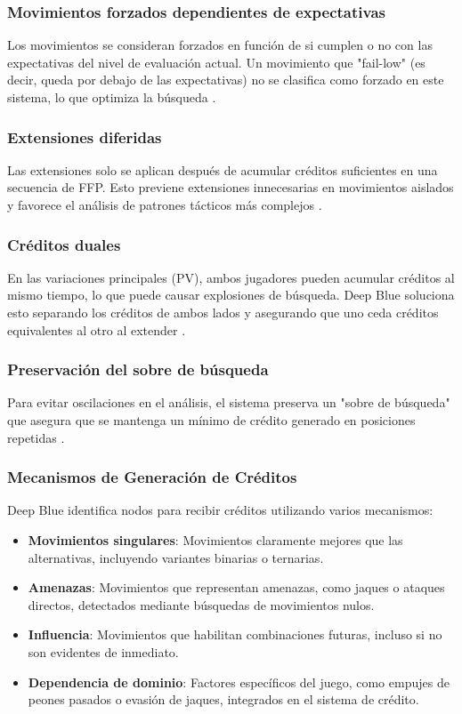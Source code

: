 \documentclass[12pt,a4paper]{article}
\begin{document}
\subsubsection*{Movimientos forzados dependientes de expectativas}
Los movimientos se consideran forzados en función de si cumplen o no con las expectativas del nivel de evaluación actual. Un movimiento que "fail-low" (es decir, queda por debajo de las expectativas) no se clasifica como forzado en este sistema, lo que optimiza la búsqueda \cite{campbell2002deepblue}.

\subsubsection*{Extensiones diferidas}
Las extensiones solo se aplican después de acumular créditos suficientes en una secuencia de FFP. Esto previene extensiones innecesarias en movimientos aislados y favorece el análisis de patrones tácticos más complejos \cite{campbell2002deepblue}.

\subsubsection*{Créditos duales}
En las variaciones principales (PV), ambos jugadores pueden acumular créditos al mismo tiempo, lo que puede causar explosiones de búsqueda. Deep Blue soluciona esto separando los créditos de ambos lados y asegurando que uno ceda créditos equivalentes al otro al extender \cite{campbell2002deepblue}.

\subsubsection*{Preservación del sobre de búsqueda}
Para evitar oscilaciones en el análisis, el sistema preserva un "sobre de búsqueda" que asegura que se mantenga un mínimo de crédito generado en posiciones repetidas \cite{campbell2002deepblue}.

\subsubsection*{Mecanismos de Generación de Créditos}
Deep Blue identifica nodos para recibir créditos utilizando varios mecanismos:
\begin{itemize}
    \item \textbf{Movimientos singulares}: Movimientos claramente mejores que las alternativas, incluyendo variantes binarias o ternarias.
    \item \textbf{Amenazas}: Movimientos que representan amenazas, como jaques o ataques directos, detectados mediante búsquedas de movimientos nulos.
    \item \textbf{Influencia}: Movimientos que habilitan combinaciones futuras, incluso si no son evidentes de inmediato.
    \item \textbf{Dependencia de dominio}: Factores específicos del juego, como empujes de peones pasados o evasión de jaques, integrados en el sistema de crédito.
\end{itemize}
\end{document}
